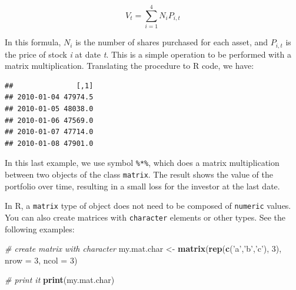 \documentclass[11pt,]{book}
\newenvironment{Shaded}{\begin{snugshade}}{\end{snugshade}}
\newcommand{\KeywordTok}[1]{\textcolor[rgb]{0.27,0.27,0.27}{\textbf{#1}}}
\newcommand{\DataTypeTok}[1]{\textcolor[rgb]{0.27,0.27,0.27}{#1}}
\newcommand{\DecValTok}[1]{\textcolor[rgb]{0.06,0.06,0.06}{#1}}
\newcommand{\StringTok}[1]{\textcolor[rgb]{0.5,0.5,0.5}{#1}}
\newcommand{\CommentTok}[1]{\textcolor[rgb]{0.56,0.35,0.01}{\textit{#1}}}
\newcommand{\OperatorTok}[1]{\textcolor[rgb]{0.81,0.36,0.00}{\textbf{#1}}}
\newcommand{\NormalTok}[1]{#1}
\begin{document}
\[V _t = \sum _{i=1} ^{4} N _i P_{i,t}\]

In this formula, \(N_i\) is the number of shares purchased for each
asset, and \(P_{i,t}\) is the price of stock \emph{i} at date \emph{t}.
This is a simple operation to be performed with a matrix multiplication.
Translating the procedure to R code, we have:

\begin{Shaded}
\end{Shaded}

\begin{verbatim}
##               [,1]
## 2010-01-04 47974.5
## 2010-01-05 48038.0
## 2010-01-06 47569.0
## 2010-01-07 47714.0
## 2010-01-08 47901.0
\end{verbatim}

In this last example, we use symbol \texttt{\%*\%}, which does a matrix
multiplication between two objects of the class \texttt{matrix}. The
result shows the value of the portfolio over time, resulting in a small
loss for the investor at the last date. 

In R, a \texttt{matrix} type of object does not need to be composed of
\texttt{numeric} values. You can also create matrices with
\texttt{character} elements or other types. See the following examples:

\begin{Shaded}
\begin{Highlighting}[]
\CommentTok{# create matrix with character}
\NormalTok{my.mat.char <-}\StringTok{ }\KeywordTok{matrix}\NormalTok{(}\KeywordTok{rep}\NormalTok{(}\KeywordTok{c}\NormalTok{(}\StringTok{'a'}\NormalTok{,}\StringTok{'b'}\NormalTok{,}\StringTok{'c'}\NormalTok{), }\DecValTok{3}\NormalTok{), }
                      \DataTypeTok{nrow =} \DecValTok{3}\NormalTok{, }
                      \DataTypeTok{ncol =} \DecValTok{3}\NormalTok{)}

\CommentTok{# print it                    }
\KeywordTok{print}\NormalTok{(my.mat.char)}
\end{Highlighting}
\end{Shaded}
\end{document}
